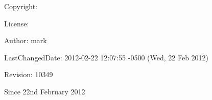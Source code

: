 \begin{DoxyParagraph}{Copyright\-:}

\end{DoxyParagraph}
\begin{DoxyParagraph}{License\-:}

\end{DoxyParagraph}
\begin{DoxyParagraph}{Author\-:}
mark 
\end{DoxyParagraph}
\begin{DoxyParagraph}{Last\-Changed\-Date\-:}
2012-\/02-\/22 12\-:07\-:55 -\/0500 (Wed, 22 Feb 2012) 
\end{DoxyParagraph}
\begin{DoxyParagraph}{Revision\-:}
10349 
\end{DoxyParagraph}
\begin{DoxySince}{Since}
22nd February 2012 
\end{DoxySince}
